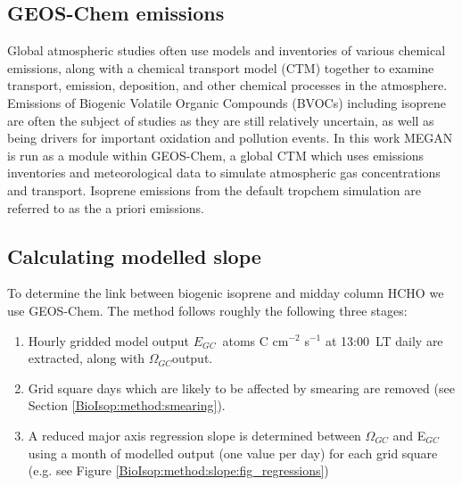     
  \subsection{GEOS-Chem emissions}
  
    Global atmospheric studies often use models and inventories of various chemical emissions, along with a chemical transport model (CTM) together to examine transport, emission, deposition, and other chemical processes in the atmosphere.
    Emissions of Biogenic Volatile Organic Compounds (BVOCs) including isoprene are often the subject of studies as they are still relatively uncertain, as well as being drivers for important oxidation and pollution events.
    In this work MEGAN is run as a module within GEOS-Chem, a global CTM which uses emissions inventories and meteorological data to simulate atmospheric gas concentrations and transport.
    Isoprene emissions from the default tropchem simulation are referred to as the a priori emissions.
    
  
  \subsection{Calculating modelled slope}
    \label{BioIsop:method:slope}
    
    To determine the link between biogenic isoprene and midday column HCHO we use GEOS-Chem.
    The method follows roughly the following three stages: 
    \begin{enumerate}
      \item 
        Hourly gridded model output $E_{GC}$~atoms C cm$^{-2}$ s$^{-1}$ at 13:00~LT daily are extracted, along with $\Omega_{GC}$\moleccm output.
      \item
        Grid square days which are likely to be affected by smearing are removed (see Section \ref{BioIsop:method:smearing}).
      \item 
        A reduced major axis regression slope is determined between $\Omega_{GC}$ and E$_{GC}$ using a month of modelled output (one value per day) for each grid square (e.g. see Figure \ref{BioIsop:method:slope:fig_regressions})
    \end{enumerate}
    
